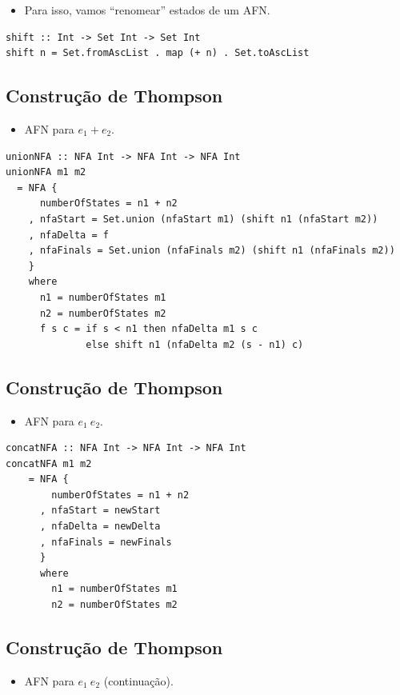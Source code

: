 \documentclass[11pt]{article}
\begin{document}
\begin{itemize}
\item Para isso, vamos ``renomear'' estados de um AFN.
\end{itemize}

\begin{verbatim}
shift :: Int -> Set Int -> Set Int
shift n = Set.fromAscList . map (+ n) . Set.toAscList
\end{verbatim}
\subsection*{Construção de Thompson}
\label{sec:orge0cbd3a}

\begin{itemize}
\item AFN para \(e_1 + e_2\).
\end{itemize}

\begin{verbatim}
unionNFA :: NFA Int -> NFA Int -> NFA Int
unionNFA m1 m2
  = NFA {
      numberOfStates = n1 + n2
    , nfaStart = Set.union (nfaStart m1) (shift n1 (nfaStart m2))
    , nfaDelta = f
    , nfaFinals = Set.union (nfaFinals m2) (shift n1 (nfaFinals m2))
    }
    where
      n1 = numberOfStates m1
      n2 = numberOfStates m2
      f s c = if s < n1 then nfaDelta m1 s c
              else shift n1 (nfaDelta m2 (s - n1) c)
\end{verbatim}
\subsection*{Construção de Thompson}
\label{sec:orgeeddfbe}

\begin{itemize}
\item AFN para \(e_1\:e_2\).
\end{itemize}

\begin{verbatim}
concatNFA :: NFA Int -> NFA Int -> NFA Int
concatNFA m1 m2
    = NFA {
        numberOfStates = n1 + n2
      , nfaStart = newStart
      , nfaDelta = newDelta
      , nfaFinals = newFinals
      }
      where
        n1 = numberOfStates m1
        n2 = numberOfStates m2
\end{verbatim}
\subsection*{Construção de Thompson}
\label{sec:org3ae0779}

\begin{itemize}
\item AFN para \(e_1\:e_2\) (continuação).
\end{itemize}
\end{document}
